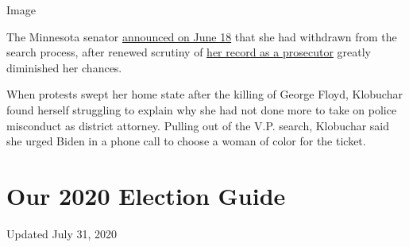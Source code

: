 Image

The Minnesota senator
\href{https://www.nytimes3xbfgragh.onion/2020/06/18/us/politics/amy-klobuchar-biden-vice-president.html}{announced
on June 18} that she had withdrawn from the search process, after
renewed scrutiny of
\href{https://www.nytimes3xbfgragh.onion/2020/05/29/us/politics/klobuchar-minneapolis-george-floyd.html}{her
record as a prosecutor} greatly diminished her chances.

When protests swept her home state after the killing of George Floyd,
Klobuchar found herself struggling to explain why she had not done more
to take on police misconduct as district attorney. Pulling out of the
V.P. search, Klobuchar said she urged Biden in a phone call to choose a
woman of color for the ticket.

\hypertarget{our-2020-election-guide}{%
\section{Our 2020 Election Guide}\label{our-2020-election-guide}}

Updated July 31, 2020

